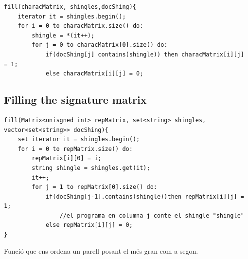 \documentclass[12pt]{article}
\begin{document}
 
\begin{lstlisting}
fill(characMatrix, shingles,docShing){
    iterator it = shingles.begin();
    for i = 0 to characMatrix.size() do:
        shingle = *(it++);
        for j = 0 to characMatrix[0].size() do:
            if(docShing[j] contains(shingle)) then characMatrix[i][j] = 1;
            else characMatrix[i][j] = 0;
\end{lstlisting}
\medskip

\subsection{Filling the signature matrix}
\begin{lstlisting}
fill(Matrix<unisgned int> repMatrix, set<string> shingles, 
vector<set<string>> docShing){
	set iterator it = shingles.begin();	
	for i = 0 to repMatrix.size() do:
		repMatrix[i][0] = i;
		string shingle = shingles.get(it);
		it++; 
		for j = 1 to repMatrix[0].size() do:
			if(docShing[j-1].contains(shingle))then repMatrix[i][j] = 1;
				//el programa en columna j conte el shingle "shingle"
			else repMatrix[i][j] = 0;
}
\end{lstlisting}
\medskip

\begin{large}Funció que ens ordena un parell posant el més gran com a segon.
\end{large}
\end{document}
